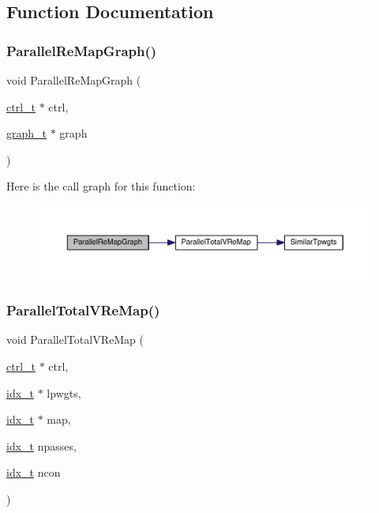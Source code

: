 \subsection{Function Documentation}
\mbox{\label{a00395_a88aeef4a2abd395ed5ef87820593d791}} 
\subsubsection{\texorpdfstring{Parallel\+Re\+Map\+Graph()}{ParallelReMapGraph()}}
{\footnotesize\ttfamily void Parallel\+Re\+Map\+Graph (\begin{DoxyParamCaption}\item[{\hyperlink{a00742}{ctrl\+\_\+t} $\ast$}]{ctrl,  }\item[{\hyperlink{a00734}{graph\+\_\+t} $\ast$}]{graph }\end{DoxyParamCaption})}

Here is the call graph for this function\+:\nopagebreak
\begin{figure}[H]
\begin{center}
\leavevmode
\includegraphics[width=350pt]{a00395_a88aeef4a2abd395ed5ef87820593d791_cgraph}
\end{center}
\end{figure}
\mbox{\label{a00395_a2ee84cc2bb186c63e443c5b0dee580d1}} 
\subsubsection{\texorpdfstring{Parallel\+Total\+V\+Re\+Map()}{ParallelTotalVReMap()}}
{\footnotesize\ttfamily void Parallel\+Total\+V\+Re\+Map (\begin{DoxyParamCaption}\item[{\hyperlink{a00742}{ctrl\+\_\+t} $\ast$}]{ctrl,  }\item[{\hyperlink{a00876_aaa5262be3e700770163401acb0150f52}{idx\+\_\+t} $\ast$}]{lpwgts,  }\item[{\hyperlink{a00876_aaa5262be3e700770163401acb0150f52}{idx\+\_\+t} $\ast$}]{map,  }\item[{\hyperlink{a00876_aaa5262be3e700770163401acb0150f52}{idx\+\_\+t}}]{npasses,  }\item[{\hyperlink{a00876_aaa5262be3e700770163401acb0150f52}{idx\+\_\+t}}]{ncon }\end{DoxyParamCaption})}

